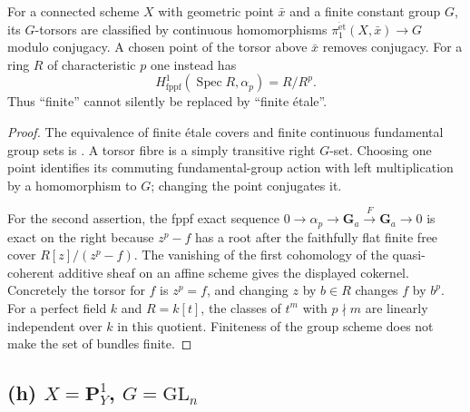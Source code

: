 \begin{proposition}
\label{geo-Kg}
For a connected scheme $X$ with geometric point $\bar x$ and a finite
constant group $G$, its $G$-torsors are classified by continuous
homomorphisms $\pi_1^{\mathrm{\acute et}}(X,\bar x)\to G$ modulo
conjugacy. A chosen point of the torsor above $\bar x$ removes conjugacy.
For a ring $R$ of characteristic $p$ one instead has
\[
 H^1_{\mathrm{fppf}}(\operatorname{Spec}R,\alpha_p)=R/R^p.
\]
Thus ``finite'' cannot silently be replaced by ``finite \'etale''.
\end{proposition}
\begin{proof}
The equivalence of finite \'etale covers and finite continuous fundamental
group sets is \cite[Theorem 58.6.2, tag 0BND]{geoStacksPiOne}.
A torsor fibre is a simply transitive right $G$-set. Choosing one point
identifies its commuting fundamental-group action with left multiplication
by a homomorphism to $G$; changing the point conjugates it.

For the second assertion, the fppf exact sequence
$0\to\alpha_p\to\mathbf G_a\xrightarrow{F}\mathbf G_a\to0$
is exact on the right because $z^p-f$ has a root after the faithfully flat
finite free cover $R[z]/(z^p-f)$. The vanishing of the first cohomology of
the quasi-coherent additive sheaf on an affine scheme gives the displayed
cokernel. Concretely the torsor for $f$ is $z^p=f$, and changing $z$ by
$b\in R$ changes $f$ by $b^p$. For a perfect field $k$ and $R=k[t]$, the
classes of $t^m$ with $p\nmid m$ are linearly independent over $k$ in this
quotient. Finiteness of the group scheme does not make the set of bundles
finite.
\end{proof}

\subsection{(h) \texorpdfstring{$X=\mathbf P^1_Y$, $G=\mathrm{GL}_n$}{X=P1 over Y, G=GL(n)}}

